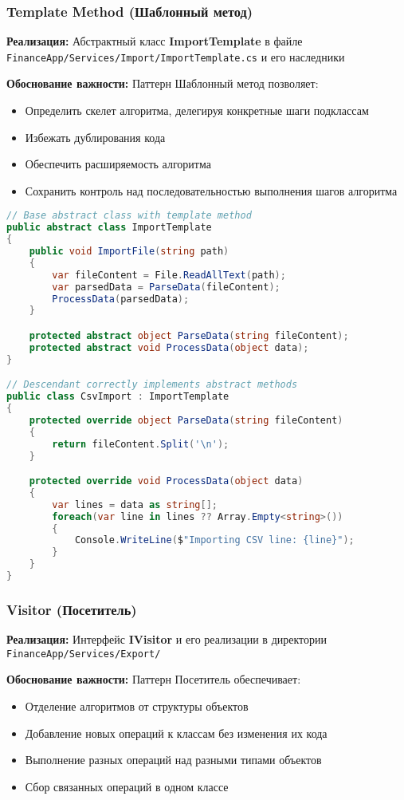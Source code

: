 \documentclass[12pt,a4paper]{article}
\begin{document}
\subsubsection{Template Method (Шаблонный метод)}

\textbf{Реализация:} Абстрактный класс \textbf{ImportTemplate} в файле \texttt{FinanceApp/Services/Import/ImportTemplate.cs} и его наследники

\textbf{Обоснование важности:} Паттерн Шаблонный метод позволяет:
\begin{itemize}
    \item Определить скелет алгоритма, делегируя конкретные шаги подклассам
    \item Избежать дублирования кода
    \item Обеспечить расширяемость алгоритма
    \item Сохранить контроль над последовательностью выполнения шагов алгоритма
\end{itemize}

\begin{lstlisting}[language=csharp]
// Base abstract class with template method
public abstract class ImportTemplate
{
    public void ImportFile(string path)
    {
        var fileContent = File.ReadAllText(path);
        var parsedData = ParseData(fileContent);
        ProcessData(parsedData);
    }

    protected abstract object ParseData(string fileContent);
    protected abstract void ProcessData(object data);
}

// Descendant correctly implements abstract methods
public class CsvImport : ImportTemplate
{
    protected override object ParseData(string fileContent)
    {
        return fileContent.Split('\n');
    }

    protected override void ProcessData(object data)
    {
        var lines = data as string[];
        foreach(var line in lines ?? Array.Empty<string>())
        {
            Console.WriteLine($"Importing CSV line: {line}");
        }
    }
}
\end{lstlisting}

\subsubsection{Visitor (Посетитель)}

\textbf{Реализация:} Интерфейс \textbf{IVisitor} и его реализации в директории \texttt{FinanceApp/Services/Export/}

\textbf{Обоснование важности:} Паттерн Посетитель обеспечивает:
\begin{itemize}
    \item Отделение алгоритмов от структуры объектов
    \item Добавление новых операций к классам без изменения их кода
    \item Выполнение разных операций над разными типами объектов
    \item Сбор связанных операций в одном классе
\end{itemize}
\end{document}
